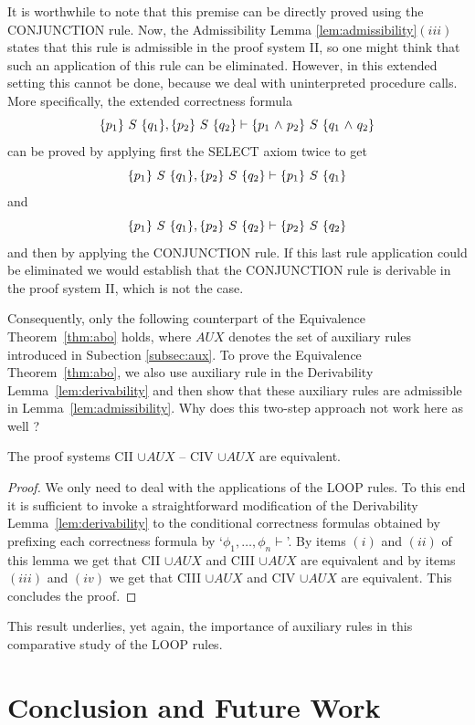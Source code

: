 \documentclass[manuscript, screen, review]{acmart}
\newcommand{\AUX}{\mathit{AUX}}
\begin{document}
It is worthwhile to note that this premise can be directly proved
using the CONJUNCTION rule.  Now, the Admissibility Lemma
\ref{lem:admissibility}$(iii)$ states that this rule is admissible in
the proof system II, so one might think that such an application of
this rule can be eliminated.  However, in this extended setting this
cannot be done, because we deal with uninterpreted procedure calls.
More specifically, the extended correctness formula
\[
  \mbox{$\{{p_1}\}\ {S}\ \{{q_1}\}$}, \mbox{$\{{p_2}\}\ {S}\ \{{q_2}\}$}  \vdash \mbox{$\{{p_1 \mbox{$\ \wedge\ $} p_2}\}\ {S}\ \{{q_1 \mbox{$\ \wedge\ $} q_2}\}$}         
\]
can be proved by applying first the SELECT axiom twice to get 
\[
  \mbox{$\{{p_1}\}\ {S}\ \{{q_1}\}$}, \mbox{$\{{p_2}\}\ {S}\ \{{q_2}\}$}  \vdash \mbox{$\{{p_1}\}\ {S}\ \{{q_1}\}$} 
\]
and
\[
  \mbox{$\{{p_1}\}\ {S}\ \{{q_1}\}$}, \mbox{$\{{p_2}\}\ {S}\ \{{q_2}\}$}  \vdash \mbox{$\{{p_2}\}\ {S}\ \{{q_2}\}$}
\]
and then by applying the CONJUNCTION rule.  If this last rule
application could be eliminated we would establish that the
CONJUNCTION rule is derivable in the proof system II, which is not the
case.

Consequently, only the following counterpart of the Equivalence Theorem~\ref{thm:abo}
holds, where $\AUX$ denotes the set of auxiliary rules introduced in Subection \ref{subsec:aux}.
To prove the Equivalence
Theorem~\ref{thm:abo}, we also use auxiliary rule in the Derivability
Lemma~\ref{lem:derivability} and then show that these auxiliary rules
are admissible in Lemma~\ref{lem:admissibility}.  Why does this
two-step approach not work here as well ?

\begin{theorem} \label{thm:main2}
  The proof systems CII $\cup \AUX$ -- CIV $\cup \AUX$  are equivalent.  
\end{theorem}

\begin{proof}
  We only need to deal with the applications of the LOOP rules. To this end it
  is sufficient to invoke a straightforward modification of the
  Derivability Lemma~\ref{lem:derivability} to the conditional
  correctness formulas obtained by prefixing each correctness formula
  by `$\phi_1, \dots, \phi_n \vdash$'.  By items $(i)$ and $(ii)$ of
  this lemma we get that CII $\cup \AUX$ and CIII $\cup \AUX$ are
  equivalent and by items $(iii)$ and $(iv)$ we get that CIII
  $\cup \AUX$ and CIV $\cup \AUX$ are equivalent. This concludes the
  proof.
\end{proof}

This result underlies, yet again, the importance of auxiliary rules in this comparative study of
the LOOP rules.


\section{Conclusion and Future Work}
\label{sec:conc}
\end{document}
